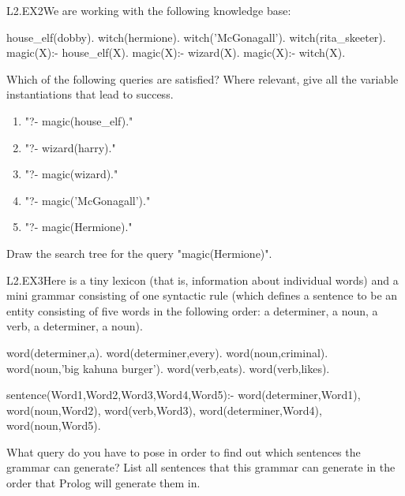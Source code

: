 \begin{LPNexercise}{L2.EX2}We are working with the following knowledge base:
\begin{LPNcodedisplay}
house_elf(dobby).
witch(hermione).
witch('McGonagall').
witch(rita_skeeter).
magic(X):- house_elf(X).
magic(X):- wizard(X).
magic(X):- witch(X).
\end{LPNcodedisplay}


Which of the following queries are satisfied? Where relevant, give all
the variable instantiations that lead to success.
\begin{enumerate}
\item{}"?- magic(house_elf)."
\item{}"?- wizard(harry)."
\item{}"?- magic(wizard)."
\item{}"?- magic('McGonagall')."
\item{}"?- magic(Hermione)."
\end{enumerate}
Draw the search tree for the query "magic(Hermione)".
\end{LPNexercise}


\begin{LPNexercise}{L2.EX3}Here is a tiny lexicon
(that is, information about individual words) and a mini grammar
consisting of one syntactic rule (which defines a sentence to be an
entity consisting of five words in the following order: a determiner,
a noun, a verb, a determiner, a noun).

\begin{LPNcodedisplay}
word(determiner,a).
word(determiner,every).
word(noun,criminal).
word(noun,'big kahuna burger').
word(verb,eats).
word(verb,likes).

sentence(Word1,Word2,Word3,Word4,Word5):-
   word(determiner,Word1),
   word(noun,Word2),
   word(verb,Word3),
   word(determiner,Word4),
   word(noun,Word5).
\end{LPNcodedisplay}
What query do you have to pose in order to find out which sentences
the grammar can generate?  List all sentences that this grammar can
generate in the order that Prolog will generate them in.
\end{LPNexercise}



